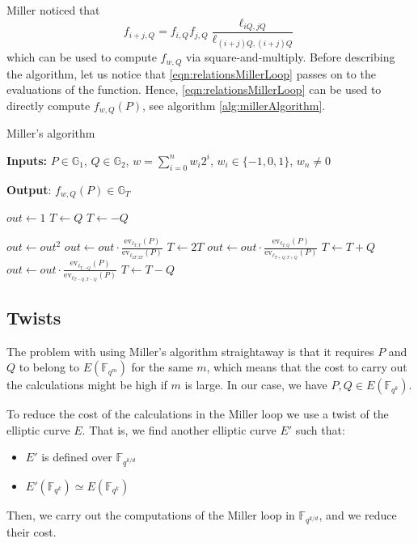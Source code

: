 \documentclass{article}
\newcommand{\gOne}{\mathbb{G}_1}
\newcommand{\gTwo}{\mathbb{G}_2}
\newcommand{\gT}{\mathbb{G}_T}
\newcommand{\ev}{\mathrm{ev}}
\newcommand{\fq}[1]{\mathbb{F}_{q^{#1}}}
\theoremstyle{remark}
\theoremstyle{plain}
\begin{document}
Miller noticed that 
\begin{equation}
    \label{eqn:relationsMillerLoop}
    f_{i+j,Q} = f_{i,Q} f_{j,Q} \frac{\ell_{iQ,jQ}}{\ell_{(i+j)Q,(i+j)Q}}
\end{equation}
which can be used to compute $f_{w,Q}$ via square-and-multiply.
Before describing the algorithm, let us notice that \eqref{eqn:relationsMillerLoop} passes on to the evaluations of the function.
Hence, \eqref{eqn:relationsMillerLoop} can be used to directly compute $f_{w,Q}(P)$, see algorithm \ref{alg:millerAlgorithm}.

\begin{algorithm}
    \caption{\small Miller's algorithm}\label{alg:millerAlgorithm}
    \textbf{Inputs:} $P \in \gOne$, $Q \in \gTwo$, $w = \sum_{i=0}^n w_i 2^i$, $w_i \in \{-1,0,1\}$, $w_n \neq 0$

    \textbf{Output}: $f_{w,Q}(P) \in \gT$
    \begin{algorithmic}
        \State $out \gets 1$
            \State $T \gets Q$
        \Else
            \State $T \gets -Q$
        \EndIf

        \State $out \gets out^2$
        \State $out \gets out \cdot \frac{\ev_{\ell_{T,T}}(P)}{\ev_{\ell_{2T,2T}}(P)}$
        \State $T \gets 2T$
            \State $out \gets out \cdot \frac{\ev_{\ell_{T,Q}}(P)}{\ev_{\ell_{T+Q,T+Q}}(P)}$
            \State $T \gets T + Q$
        \Else
            \State $out \gets out \cdot \frac{\ev_{\ell_{T,-Q}}(P)}{\ev_{\ell_{T-Q,T-Q}}(P)}$
            \State $T \gets T - Q$
        \EndIf
        \EndFor
    \end{algorithmic}
\end{algorithm}

\subsection{Twists}

The problem with using Miller's algorithm straightaway is that it requires $P$ and $Q$ to belong to $E(\fq{m})$ for the same $m$, which means that the cost to carry out the calculations might be high if $m$ is large.
In our case, we have $P, Q \in E(\fq{k})$.

To reduce the cost of the calculations in the Miller loop we use a twist of the elliptic curve $E$.
That is, we find another elliptic curve $E'$ such that:
\begin{itemize}
    \item $E'$ is defined over $\fq{k/d}$
    \item $E'(\fq{k}) \simeq E(\fq{k})$
\end{itemize}
Then, we carry out the computations of the Miller loop in $\fq{k/d}$, and we reduce their cost.
\end{document}
